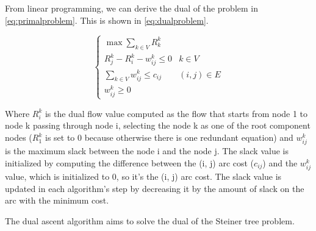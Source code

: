 From linear programming, we can derive the dual of the problem in
\eqref{eq:primalproblem}. This is shown in \eqref{eq:dualproblem}.

\begin{equation}\label{eq:dualproblem}
	\begin{cases}
		\max\sum\limits_{k \in V} R_k^k\\[10pt]
		R_j^k - R_i^k - w_{ij}^k \leq 0 & k \in V\\[10pt]
		\sum\limits_{k \in V} w_{ij}^k \leq c_{ij} & (i, j) \in
		E\\[10pt]
		w_{ij}^k \geq 0
	\end{cases}
\end{equation}

Where \(R_i^k\) is the dual flow value computed as the flow that starts from
node 1 to node k passing through node i, selecting the node k as one of the root
component nodes (\(R_1^k\) is set to 0 because otherwise there is one redundant
equation) and \(w_{ij}^k\) is the maximum slack between the node i and the node
j. The slack value is initialized by computing the difference between the (i, j)
arc cost (\(c_{ij}\)) and the \(w_{ij}^k\) value, which is initialized to 0, so
it's the (i, j) arc cost. The slack value is updated in each algorithm's step by
decreasing it by the amount of slack on the arc with the minimum cost.

The dual ascent algorithm aims to solve the dual of the Steiner tree problem.



